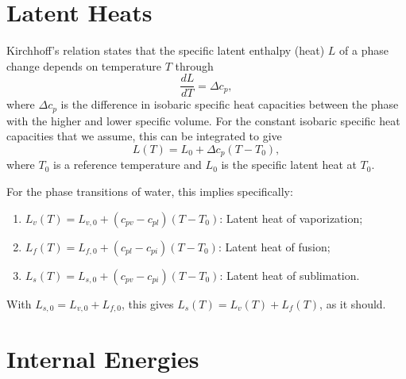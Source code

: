\documentclass{report}
\begin{document}
\section{Latent Heats}\label{s:latent_heats}

Kirchhoff's relation states that the specific latent enthalpy (heat) $L$ of a phase change depends on temperature $T$ through
\begin{equation}
    \frac{dL}{dT} = \Delta c_p,
\end{equation}
where $\Delta c_p$ is the difference in isobaric specific heat capacities between the phase with the higher and lower specific volume. For the constant isobaric specific heat capacities that we assume, this can be integrated to give
\begin{equation}
    L(T) = L_0 + \Delta c_p (T-T_0),
    \label{e:LH_temperature}
\end{equation}
where $T_0$ is a reference temperature and $L_0$ is the specific latent heat at $T_0$. 

For the phase transitions of water, this implies specifically:
\begin{enumerate}
    \item $L_v(T) = L_{v,0} + (c_{pv} - c_{pl}) (T - T_0)$: Latent heat of vaporization;
    \item $L_f(T) = L_{f,0} + (c_{pl} - c_{pi}) (T - T_0)$: Latent heat of fusion;
    \item $L_s(T) = L_{s,0} + (c_{pv} - c_{pi}) (T - T_0)$: Latent heat of sublimation.
\end{enumerate}
With $L_{s,0} = L_{v,0} + L_{f,0}$, this gives $L_s(T) = L_v(T) + L_f(T)$, as it should.

\section{Internal Energies}\label{s:internal_energies}
\end{document}
